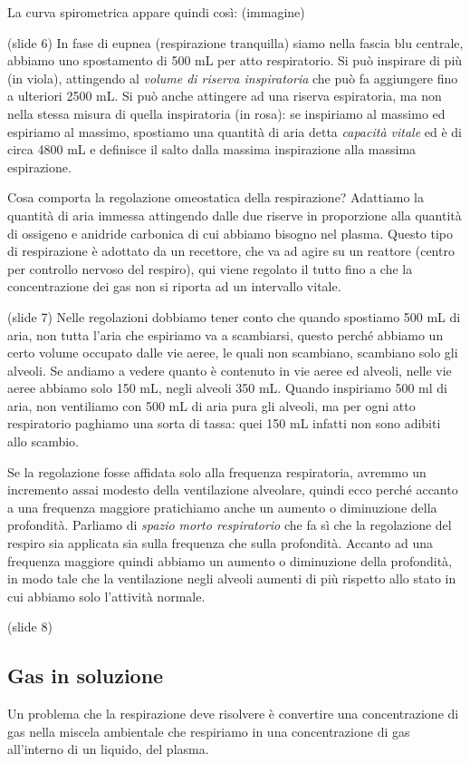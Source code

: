 \documentclass[a4paper,12pt]{article}
\begin{document}
La curva spirometrica appare quindi  così: (immagine) 

(slide 6) In fase di eupnea (respirazione tranquilla) siamo nella fascia blu centrale, abbiamo uno spostamento di 500 mL per atto respiratorio. Si può inspirare di più (in viola), attingendo al \emph{volume di riserva inspiratoria} che può fa aggiungere fino a ulteriori 2500 mL. Si può anche attingere ad una riserva espiratoria, ma non nella stessa misura di quella inspiratoria (in rosa): se inspiriamo al massimo ed espiriamo al massimo, spostiamo una quantità di aria detta \emph{capacità vitale} ed è di circa 4800 mL e definisce il salto dalla massima inspirazione alla massima espirazione.

Cosa comporta la regolazione omeostatica della respirazione? Adattiamo la quantità di aria immessa attingendo dalle due riserve in proporzione alla quantità di ossigeno e anidride carbonica di cui abbiamo bisogno nel plasma. Questo tipo di respirazione è adottato da un recettore, che va ad agire su un reattore (centro per controllo nervoso del respiro), qui viene regolato il tutto fino a che la concentrazione dei gas non si riporta ad un intervallo vitale. 

(slide 7) Nelle regolazioni dobbiamo tener conto che quando spostiamo 500 mL di aria, non tutta l'aria che espiriamo va a scambiarsi, questo perché abbiamo un certo volume occupato dalle vie aeree, le quali non scambiano, scambiano solo gli alveoli. Se andiamo a vedere quanto è contenuto in vie aeree ed alveoli, nelle vie aeree abbiamo solo 150 mL, negli alveoli 350 mL. Quando inspiriamo 500 ml di aria, non ventiliamo con 500 mL di aria pura gli alveoli, ma per ogni atto respiratorio paghiamo una sorta di tassa: quei 150 mL infatti non sono adibiti allo scambio.

Se la regolazione fosse affidata solo alla frequenza respiratoria, avremmo un incremento assai modesto della ventilazione alveolare, quindi ecco perché accanto a una frequenza maggiore pratichiamo anche un aumento o diminuzione della profondità. Parliamo di \emph{spazio morto respiratorio} che fa sì che la regolazione del respiro sia applicata sia sulla frequenza che sulla profondità. 
Accanto ad una frequenza maggiore quindi abbiamo un aumento o diminuzione della profondità, in modo tale che la ventilazione negli alveoli aumenti di più rispetto allo stato in cui abbiamo solo l'attività normale.

(slide 8) \subsection{Gas in soluzione}
Un problema che la respirazione deve risolvere è convertire una concentrazione di gas nella miscela ambientale che respiriamo in una concentrazione di gas all'interno di un liquido, del plasma.
\end{document}
